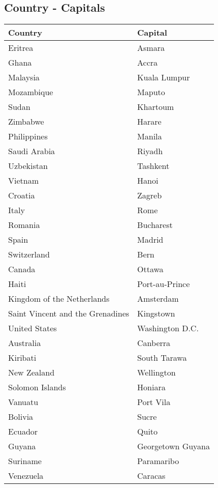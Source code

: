 \documentclass[10pt,11pt,12pt,oneside]{book}
\begin{document}
\begin{appendices}
\subsection{Country - Capitals}
\begin{table}[H]
	\begin{center}
		\begin{tabular}{|p{3in}|p{3in}|} \hline 
			Country & Capital \\ \hline 
			Eritrea & Asmara \\ \hline 
			Ghana & Accra \\ \hline 
			Malaysia & Kuala Lumpur \\ \hline 
			Mozambique & Maputo \\ \hline 
			Sudan & Khartoum \\ \hline 
			Zimbabwe & Harare \\ \hline 
			Philippines & Manila \\ \hline 
			Saudi Arabia & Riyadh \\ \hline 
			Uzbekistan & Tashkent \\ \hline 
			Vietnam & Hanoi \\ \hline 
			Croatia & Zagreb \\ \hline 
			Italy & Rome \\ \hline 
			Romania & Bucharest \\ \hline 
			Spain & Madrid \\ \hline 
			Switzerland & Bern \\ \hline 
			Canada & Ottawa \\ \hline 
			Haiti & Port-au-Prince \\ \hline 
			Kingdom of the Netherlands & Amsterdam \\ \hline 
			Saint Vincent and the Grenadines & Kingstown \\ \hline 
			United States & Washington D.C. \\ \hline 
			Australia & Canberra \\ \hline 
			Kiribati & South Tarawa \\ \hline 
			New Zealand & Wellington \\ \hline 
			Solomon Islands & Honiara \\ \hline 
			Vanuatu & Port Vila \\ \hline 
			Bolivia & Sucre \\ \hline 
			Ecuador & Quito \\ \hline 
			Guyana & Georgetown Guyana \\ \hline 
			Suriname & Paramaribo \\ \hline 
			Venezuela & Caracas \\ \hline 
		\end{tabular}
	\end{center}
\end{table}


\end{appendices}
\end{document}
